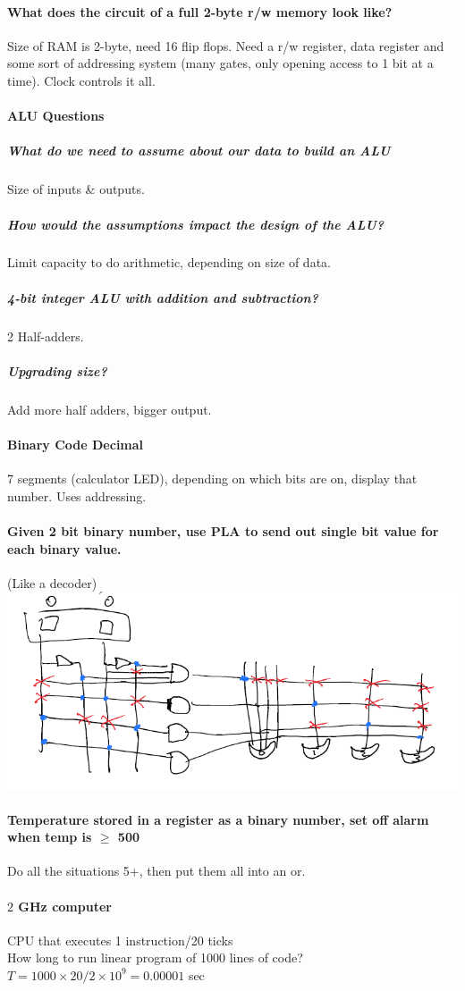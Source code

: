 \documentclass[12 pt]{article}
\begin{document}
		\paragraph{What does the circuit of a full 2-byte r/w memory look like?}
		Size of RAM is 2-byte, need 16 flip flops. Need a r/w register, data register and some sort of addressing system (many gates, only opening access to 1 bit at a time). Clock controls it all.
		\paragraph{ALU Questions}
		\subparagraph{What do we need to assume about our data to build an ALU}
		Size of inputs \& outputs.
		\subparagraph{How would the assumptions impact the design of the ALU?} Limit capacity to do arithmetic, depending on size of data.
		\subparagraph{4-bit integer ALU with addition and subtraction?} 2 Half-adders.
		\subparagraph{Upgrading size?} Add more half adders, bigger output.
		\paragraph{Binary Code Decimal}
		7 segments (calculator LED), depending on which bits are on, display that number. Uses addressing.
		\paragraph{Given 2 bit binary number, use PLA to send out single bit value for each binary value.} (Like a decoder) \\
		\includegraphics[scale=0.8]{pladd}
		\paragraph{Temperature stored in a register as a binary number, set off alarm when temp is $\geq$ 500} Do all the situations 5+, then put them all into an or.
		\paragraph{$2$ GHz computer}
		CPU that executes 1 instruction/20 ticks
		\\ How long to run linear program of 1000 lines of code?
		\\$T=1000\times 20/2\times10^9=0.00001$ sec
\end{document}

